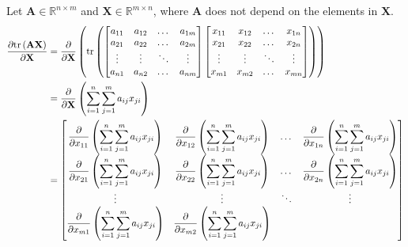 \documentclass{article}
\newcommand{\tr}[1]{\ensuremath{\textnormal{tr}\left(#1\right)}} %
\begin{document}
Let \(\mathbf{A} \in \mathbb{R}^{n\times m}\) and \(\mathbf{X} \in \mathbb{R}^{m\times n}\), where \(\mathbf{A}\) does not depend on the elements in \(\mathbf{X}\).
\begin{align*}
    \dfrac{\partial \textnormal{tr}\left(\mathbf{A} \mathbf{X}\right)}{\partial \mathbf{X}} &= \dfrac{\partial}{\partial \mathbf{X}} \left( \tr{\begin{bmatrix}
        a_{11} & a_{12} & \dots & a_{1m} \\
        a_{21} & a_{22} & \dots & a_{2m} \\
        \vdots & \vdots & \ddots & \vdots \\
        a_{n1} & a_{n2} & \dots & a_{nm} \\
    \end{bmatrix}
    \begin{bmatrix}
        x_{11} & x_{12} & \dots & x_{1n} \\
        x_{21} & x_{22} & \dots & x_{2n} \\
        \vdots & \vdots & \ddots & \vdots \\
        x_{m1} & x_{m2} & \dots & x_{mn} \\
    \end{bmatrix} \right)} \\
    &= \dfrac{\partial}{\partial \mathbf{X}} \left( \sum_{i = 1}^{n} \sum_{j = 1}^{m} a_{ij}x_{ji} \right) \\
    &= \begin{bmatrix}
        \displaystyle \dfrac{\partial}{\partial x_{11}} \left( \sum_{i = 1}^{n} \sum_{j = 1}^{m} a_{ij}x_{ji} \right) & 
        \displaystyle \dfrac{\partial}{\partial x_{12}} \left( \sum_{i = 1}^{n} \sum_{j = 1}^{m} a_{ij}x_{ji} \right) & 
        \dots & 
        \displaystyle \dfrac{\partial}{\partial x_{1n}} \left( \sum_{i = 1}^{n} \sum_{j = 1}^{m} a_{ij}x_{ji} \right) \\
        \displaystyle \dfrac{\partial}{\partial x_{21}} \left( \sum_{i = 1}^{n} \sum_{j = 1}^{m} a_{ij}x_{ji} \right) & 
        \displaystyle \dfrac{\partial}{\partial x_{22}} \left( \sum_{i = 1}^{n} \sum_{j = 1}^{m} a_{ij}x_{ji} \right) & 
        \dots & 
        \displaystyle \dfrac{\partial}{\partial x_{2n}} \left( \sum_{i = 1}^{n} \sum_{j = 1}^{m} a_{ij}x_{ji} \right) \\
        \vdots & \vdots & \ddots & \vdots \\
        \displaystyle \dfrac{\partial}{\partial x_{m1}} \left( \sum_{i = 1}^{n} \sum_{j = 1}^{m} a_{ij}x_{ji} \right) & 
        \displaystyle \dfrac{\partial}{\partial x_{m2}} \left( \sum_{i = 1}^{n} \sum_{j = 1}^{m} a_{ij}x_{ji} \right) & 

\end{bmatrix}
\end{align*}
\end{document}
